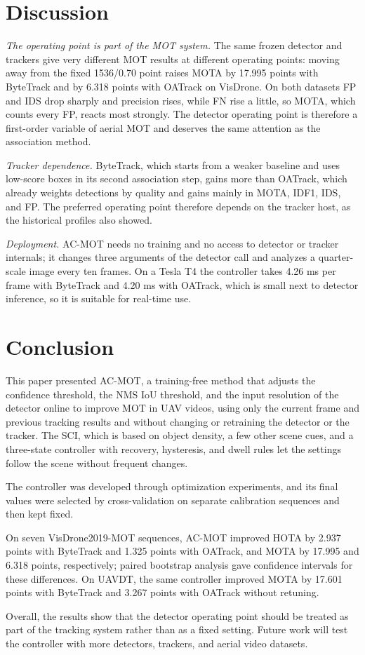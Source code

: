 \documentclass[journal]{new-aiaa}
\begin{document}
\section{Discussion}\label{sec:discussion}

\emph{The operating point is part of the MOT system.} The same frozen detector
and trackers give very different MOT results at different operating points:
moving away from the fixed 1536/0.70 point raises MOTA by 17.995 points with
ByteTrack and by 6.318 points with OATrack on VisDrone. On both datasets FP
and IDS drop sharply and precision rises, while FN rise a little, so MOTA,
which counts every FP, reacts most strongly. The detector operating point is therefore a first-order variable of
aerial MOT and deserves the same attention as the association method.

\emph{Tracker dependence.} ByteTrack, which starts from a weaker baseline and
uses low-score boxes in its second association step, gains more than OATrack,
which already weights detections by quality and gains mainly in MOTA, IDF1,
IDS, and FP. The preferred operating point therefore depends on the tracker
host, as the historical profiles also showed.

\emph{Deployment.} AC-MOT needs no training and no access to detector or
tracker internals; it changes three arguments of the detector call and
analyzes a quarter-scale image every ten frames. On a Tesla T4 the controller
takes 4.26 ms per frame with ByteTrack and 4.20 ms with OATrack, which is
small next to detector inference, so it is suitable for real-time use.
\section{Conclusion}\label{sec:conclusion}

This paper presented AC-MOT, a training-free method that adjusts the
confidence threshold, the NMS IoU threshold, and the input resolution of the
detector online to improve MOT in UAV videos, using only the current frame and
previous tracking results and without changing or retraining the detector or
the tracker. The SCI, which is based on object density, a few other scene
cues, and a three-state controller with recovery, hysteresis, and dwell rules
let the settings follow the scene without frequent changes.

The controller was developed through optimization experiments, and its final
values were selected by cross-validation on separate calibration sequences and
then kept fixed.

On seven VisDrone2019-MOT sequences, AC-MOT improved HOTA by 2.937 points with
ByteTrack and 1.325 points with OATrack, and MOTA by 17.995 and 6.318 points,
respectively; paired bootstrap analysis gave confidence intervals for these
differences. On UAVDT, the same controller improved MOTA by 17.601 points with
ByteTrack and 3.267 points with OATrack without retuning.

Overall, the results show that the detector operating point should be treated
as part of the tracking system rather than as a fixed setting. Future work
will test the controller with more detectors, trackers, and aerial video
datasets.


\end{document}

